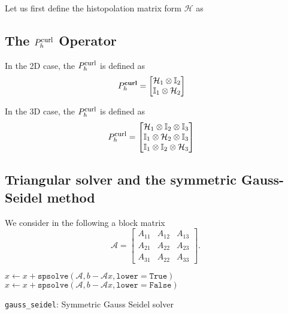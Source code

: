 Let us first define the histopolation matrix form $\mathcal{H}$ as

\subsection{The $P_h^{\mbox{\footnotesize{curl}}}$ Operator}

In the 2D case, the $P_h^{\mbox{\footnotesize{curl}}}$ is defined as 
\begin{align}
  P_h^{\textbf{curl}} &=
  \begin{bmatrix}
      \mathcal{H}_1 \otimes \mathbb{I}_2
      \\
      \mathbb{I}_1 \otimes \mathcal{H}_2
  \end{bmatrix}
\end{align}

In the 3D case, the $P_h^{\mbox{\footnotesize{curl}}}$ is defined as 
\begin{align}
    P_h^{\mbox{\footnotesize{curl}}}  & = 
    \begin{bmatrix}
      \mathcal{H}_1 \otimes \mathbb{I}_2 \otimes \mathbb{I}_3
      \\
      \mathbb{I}_1 \otimes \mathcal{H}_2 \otimes \mathbb{I}_3 
      \\
      \mathbb{I}_1 \otimes \mathbb{I}_2 \otimes \mathcal{H}_3 
    \end{bmatrix}
  \label{eq:commuting-projectors-splines-3d}
\end{align}


\subsection{Triangular solver and the symmetric Gauss-Seidel method}
We consider in the following a block matrix 
%
\begin{equation} %
\mathcal{A} =\begin{bmatrix}
 A_{11} & A_{12} & A_{13}  \\
 A_{21} & A_{22} & A_{23}  \\
 A_{31} & A_{22} & A_{33}  
\end{bmatrix}.
\end{equation}
%

\begin{algorithm}[H]
\DontPrintSemicolon
\SetAlgoLined
{}
\BlankLine

   {
    $x \gets x + \texttt{spsolve}(\mathcal{A}, b - \mathcal{A} x, \texttt{lower}=\texttt{True})$ \; 
  }
   {
    $x \gets x + \texttt{spsolve}(\mathcal{A}, b - \mathcal{A} x, \texttt{lower}=\texttt{False})$ \; 
  }

\caption{\texttt{gauss\_seidel}: Symmetric Gauss Seidel solver}
\end{algorithm} 

